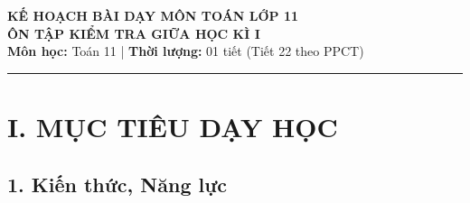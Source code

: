 \documentclass[12pt, a4paper]{article}
\begin{document}
\begin{center}
    {\Large \textbf{KẾ HOẠCH BÀI DẠY MÔN TOÁN LỚP 11}}\\[0.4em]
    {\LARGE \textbf{ÔN TẬP KIỂM TRA GIỮA HỌC KÌ I}}\\[0.5em]
    \textbf{Môn học:} Toán 11 | \textbf{Thời lượng:} 01 tiết (Tiết 22 theo PPCT)
\end{center}

\vspace{0.5em}
\hrule
\vspace{1em}

\section*{I. MỤC TIÊU DẠY HỌC}

\subsection*{1. Kiến thức, Năng lực}
\end{document}
